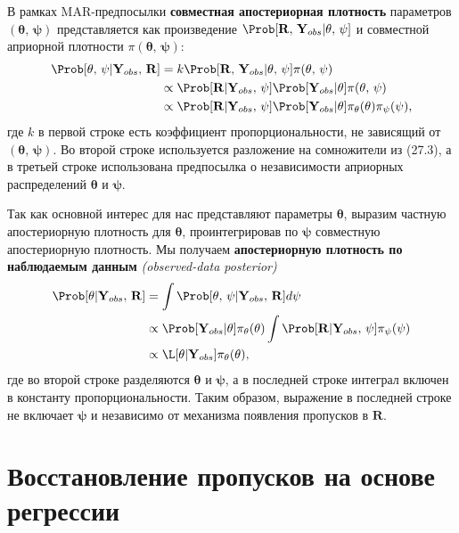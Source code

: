 В рамках MAR-предпосылки {\bf совместная апостериорная плотность}  параметров $(\mathbf{\theta}, \, \mathbf{\psi})$ представляется как произведение $\Prob[\mathbf{R}, \, \mathbf{Y}_{obs}|\mathbf{\theta}, \, \mathbf{\psi}]$ и совместной априорной плотности $\pi (\mathbf{\theta}, \, \mathbf{\psi})$:
\begin{align}
\Prob[\mathbf{\theta}, \, \mathbf{\psi}|\mathbf{Y}_{obs}, \, \mathbf{R}] &= k \Prob[\mathbf{R}, \, \mathbf{Y}_{obs}|\mathbf{\theta}, \, \mathbf{\psi}] \pi (\mathbf{\theta}, \, \mathbf{\psi}) \\
&\propto \Prob[\mathbf{R}|\mathbf{Y}_{obs}, \, \mathbf{\psi}] \Prob[\mathbf{Y}_{obs}|\mathbf{\theta}]\pi (\mathbf{\theta}, \, \mathbf{\psi}) \notag \\
&\propto \Prob[\mathbf{R}|\mathbf{Y}_{obs}, \, \mathbf{\psi}] \Prob[\mathbf{Y}_{obs}|\mathbf{\theta}]\pi_{\theta} (\mathbf{\theta})\pi_{\psi} (\mathbf{\psi}), \notag
\end{align}
где $k$ в первой строке есть коэффициент пропорциональности, не зависящий от $(\mathbf{\theta}, \, \mathbf{\psi})$. Во второй строке используется разложение на сомножители из (27.3), а в третьей строке использована предпосылка о независимости априорных распределений $\mathbf{\theta}$ и $\mathbf{\psi}$.

Так как основной интерес для нас представляют параметры $\mathbf{\theta}$, выразим частную апостериорную плотность для $\mathbf{\theta}$, проинтегрировав по $\mathbf{\psi}$  совместную апостериорную плотность. Мы получаем {\bf апостериорную плотность по наблюдаемым данным} \emph{(observed-data posterior)}
\begin{align}
\Prob[\mathbf{\theta}|\mathbf{Y}_{obs}, \, \mathbf{R}] &= \int \Prob[\mathbf{\theta}, \, \mathbf{\psi}|\mathbf{Y}_{obs}, \, \mathbf{R}]d\mathbf{\psi} \\
&\propto \Prob[\mathbf{Y}_{obs}|\mathbf{\theta}]\pi_{\theta} (\mathbf{\theta}) \int \Prob[\mathbf{R}|\mathbf{Y}_{obs}, \, \mathbf{\psi}]\pi_{\psi} (\mathbf{\psi}) \notag \\
&\propto \L [\mathbf{\theta}|\mathbf{Y}_{obs}]\pi_{\theta} (\mathbf{\theta}), \notag 
\end{align}
где во второй строке разделяются $\mathbf{\theta}$ и $\mathbf{\psi}$, а в последней строке интеграл включен в константу пропорциональности. Таким образом, выражение в последней строке не включает $\mathbf{\psi}$ и независимо от механизма появления пропусков в $\mathbf{R}$.

\section{Восстановление пропусков на основе регрессии} 

